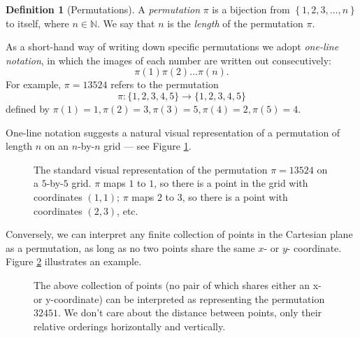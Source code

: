 \documentclass[11pt,a4paper]{article}
\theoremstyle{definition}
\newtheorem{defn}[thm]{Definition}
\begin{document}
\begin{defn}[Permutations]
A \emph{permutation} $\pi$ is a bijection from $\left\{1,2,3,\dots,n\right\}$ to itself, where $n \in \mathbb{N}$. We say that $n$ is the \emph{length} of the permutation $\pi$.
\end{defn}
As a short-hand way of writing down specific permutations we adopt \emph{one-line notation}, in which the images of each number are written out consecutively:
\[
\pi(1)\pi(2)\dots\pi(n).
\]
For example, $\pi = 13524$ refers to the permutation
\[
\pi : \{1,2,3,4,5\} \rightarrow \{1,2,3,4,5\}
\]
defined by $\pi(1)=1,\pi(2)=3,\pi(3)=5,\pi(4)=2,\pi(5)=4$.

One-line notation suggests a natural visual representation of a permutation of length $n$ on an $n$-by-$n$ grid --- see Figure \ref{fig:visrep}.

\begin{figure}[h!]
\begin{center}
\end{center}
\caption{The standard visual representation of the permutation $\pi = 13524$ on a $5$-by-$5$ grid. $\pi$ maps $1$ to $1$, so there is a point in the grid with coordinates $(1,1)$; $\pi$ maps $2$ to $3$, so there is a point with coordinates $(2,3)$, etc.}
\label{fig:visrep}
\end{figure}

Conversely, we can interpret any finite collection of points in the Cartesian plane as a permutation, as long as no two points share the same $x$- or $y$- coordinate. Figure \ref{fig:visrep2} illustrates an example.

\begin{figure}[h]
\begin{center}
\end{center}
\caption{The above collection of points (no pair of which shares either an x- or y-coordinate) can be interpreted as representing the permutation $32451$. We don't care about the distance between points, only their relative orderings horizontally and vertically.}
\label{fig:visrep2}
\end{figure}
\end{document}
